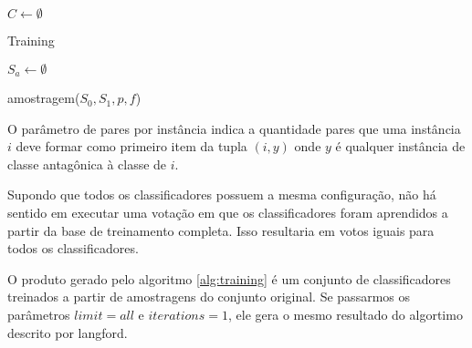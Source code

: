 \begin{algorithm}

    $C \gets \emptyset$



    \caption{Training}
    \label{alg:training}
\end{algorithm}

\begin{function}

    $S_a \gets \emptyset$\;
    



    \caption{amostragem($S_0, S_1, p, f$)}
    \label{func:amostragem}
\end{function}

O parâmetro de pares por instância indica a quantidade pares que uma instância $i$ deve formar como primeiro item da tupla $(i, y)$ onde $y$ é qualquer instância de classe antagônica à classe de $i$.

Supondo que todos os classificadores possuem a mesma configuração, não há sentido em executar uma votação em que os classificadores foram aprendidos a partir da base de treinamento completa. Isso resultaria em votos iguais para todos os classificadores.

O produto gerado pelo algoritmo \ref{alg:training} é um conjunto de classificadores treinados a partir de amostragens do conjunto original. Se passarmos os parâmetros $limit=all$ e $iterations=1$, ele gera o mesmo resultado do algortimo descrito por {{langford}}.

